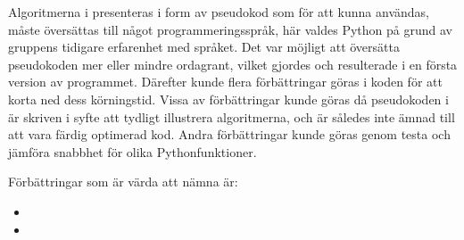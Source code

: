 
Algoritmerna i \cite{HaraldSieve} presenteras i form av pseudokod som för att kunna användas, måste översättas till något programmeringsspråk,
här valdes Python på grund av gruppens tidigare erfarenhet med språket. Det var möjligt att översätta pseudokoden mer eller mindre ordagrant,
vilket gjordes och resulterade i en första version av programmet.
Därefter kunde flera förbättringar göras i koden för att korta ned dess körningstid. 
Vissa av förbättringar kunde göras då pseudokoden i \cite{HaraldSieve} är skriven i syfte att tydligt illustrera algoritmerna,
och är således inte ämnad till att vara färdig optimerad kod.
Andra förbättringar kunde göras genom testa och jämföra snabbhet för olika Pythonfunktioner.

Förbättringar som är värda att nämna är:
\begin{itemize}
  \item 
  \item 
\end{itemize}




